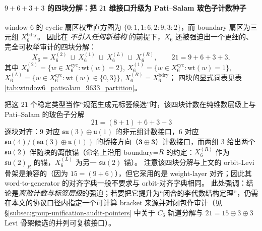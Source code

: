 \paragraph{\texorpdfstring{$9+6+3+3$}{9+6+3+3} 的四块分解：把 \texorpdfstring{$21$}{21} 维接口升级为 Pati--Salam 玻色子计数种子}
window-6 的 cyclic 扇区权重直方图为 \(\{0:1,1:6,2:9,3:2\}\)，而 boundary 扇区为三元组 \(X_6^{\mathrm{bdry}}\)。
因此在 \emph{不引入任何新结构} 的前提下，\(X_6\) 还被强迫出一个更细的、完全可枚举审计的四块分解：
\[
X_6
=X^{(2)}_6\ \sqcup\ X^{(1)}_6\ \sqcup\ X^{(L)}_6\ \sqcup\ X^{(R)}_6,
\qquad
21=9+6+3+3,
\]
其中
\(
X^{(2)}_6=\{w\in X_6^{\mathrm{cyc}}:\mathrm{wt}(w)=2\}
\),
\(
X^{(1)}_6=\{w\in X_6^{\mathrm{cyc}}:\mathrm{wt}(w)=1\}
\),
\(
X^{(L)}_6=\{w\in X_6^{\mathrm{cyc}}:\mathrm{wt}(w)\in\{0,3\}\}
\),
\(
X^{(R)}_6=X_6^{\mathrm{bdry}}
\)；
四块的显式词表见表 \ref{tab:window6_patisalam_9633_partition}。

\par
把这 \(21\) 个稳定类型当作“规范生成元标签候选”时，该四块计数在纯维数层级上与 Pati--Salam 的玻色子分解
\[
21=(8+1)+6+3+3
\]
逐块对齐：\(9\) 对应 \(\mathfrak{su}(3)\oplus\mathfrak{u}(1)\) 的非元组计数接口，\(6\) 对应
\(\mathfrak{su}(4)/(\mathfrak{su}(3)\oplus\mathfrak{u}(1))\) 的桥接方向（\(\mathbf{3}\oplus\bar{\mathbf{3}}\)）计数接口，而两组 \(3\) 给出两个 \(\mathfrak{su}(2)\) 伴随块的离散锚（命名上沿用 boundary=\(R\) 的约定：\(X^{(R)}_6\) 作为 \(\mathfrak{su}(2)_R\) 的锚，\(X^{(L)}_6\) 为另一 \(\mathfrak{su}(2)\) 锚）。
注意该四块分解与上文的 orbit-Levi 骨架是兼容的（因为 \(15=(9+6)\)），但它采用的是 weight-layer 对齐；因此其 word-to-generator 的对齐字典一般不要求与 orbit-对齐字典相同。
此处强调：结论是\emph{离散计数与标签层级}的强迫；若要把它提升为“闭合的李代数结构定理”，仍需在本文的协议口径内指定一个可计算 bracket 来源并对闭包作审计（见 \S\ref{subsec:group-unification-audit-pointers} 中关于 \(C_6\) 轨道分解与 \(21=15\oplus 3\oplus 3\) Levi 骨架候选的并列可复核接口）。

